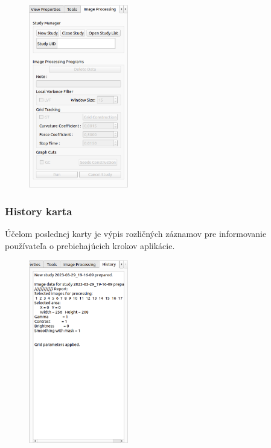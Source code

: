 {\begin {figure}[H]
        \centering
        \includegraphics[height=8cm]{media/existing_app/tabs/image_processing_inactive.png}
        \captionsetup{justification=centering}
\end {figure}

\subsubsection {History karta}
Účelom poslednej karty  je výpis rozličných záznamov pre informovanie používateľa o prebiehajúcich krokov aplikácie.

\begin {figure}[H]
        \centering
        \includegraphics[height=8cm]{media/existing_app/tabs/history.png}
        \captionsetup{justification=centering}
\end {figure}

}

